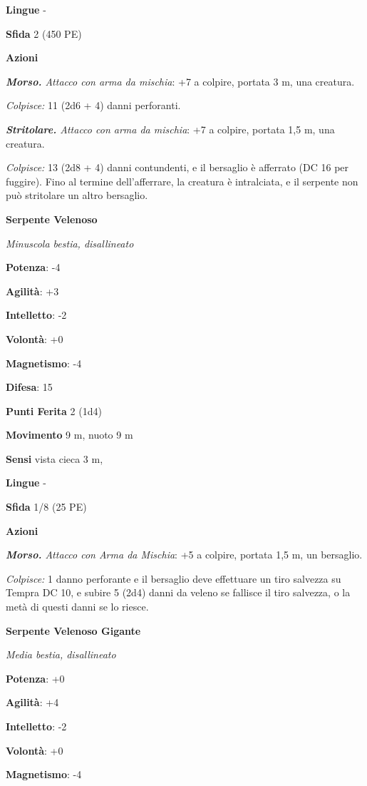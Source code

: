 \begin{multicols}{2}
\textbf{Lingue} -

\textbf{Sfida} 2 (450 PE)

\textbf{Azioni}

\emph{\textbf{Morso.} Attacco con arma da mischia}: +7 a colpire,
portata 3 m, una creatura.

\emph{Colpisce:} 11 (2d6 + 4) danni perforanti.

\emph{\textbf{Stritolare.} Attacco con arma da mischia}: +7 a colpire,
portata 1,5 m, una creatura.

\emph{Colpisce:} 13 (2d8 + 4) danni contundenti, e il bersaglio è
afferrato (DC 16 per fuggire). Fino al termine dell'afferrare, la
creatura è intralciata, e il serpente non può stritolare un altro
bersaglio.



\textbf{Serpente Velenoso}

\emph{Minuscola bestia, disallineato}

\textbf{Potenza}: -4

\textbf{Agilità}: +3

\textbf{Intelletto}: -2

\textbf{Volontà}: +0

\textbf{Magnetismo}: -4

\textbf{Difesa}: 15

\textbf{Punti Ferita} 2 (1d4)

\textbf{Movimento} 9 m, nuoto 9 m

\textbf{Sensi} vista cieca 3 m, 

\textbf{Lingue} -

\textbf{Sfida} 1/8 (25 PE)

\textbf{Azioni}

\emph{\textbf{Morso.} Attacco con Arma da Mischia}: +5 a colpire,
portata 1,5 m, un bersaglio.

\emph{Colpisce:} 1 danno perforante e il bersaglio deve effettuare un
tiro salvezza su Tempra DC 10, e subire 5 (2d4) danni da veleno se
fallisce il tiro salvezza, o la metà di questi danni se lo riesce.

\textbf{Serpente Velenoso Gigante}

\emph{Media bestia, disallineato}

\textbf{Potenza}: +0

\textbf{Agilità}: +4

\textbf{Intelletto}: -2

\textbf{Volontà}: +0

\textbf{Magnetismo}: -4


\end{multicols}
